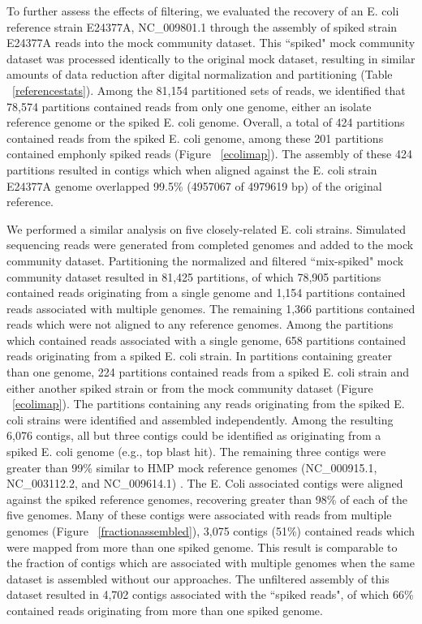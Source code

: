 \documentclass[11pt]{article} %
\begin{document}
To further assess the effects of filtering, we evaluated the recovery of an E. coli reference strain E24377A, NC\_009801.1 through the assembly of spiked strain E24377A reads into the mock community dataset.  This ``spiked" mock community dataset was processed identically to the original mock dataset, resulting in similar amounts of data reduction after digital normalization and partitioning (Table ~\ref{referencestats}).  Among the 81,154 partitioned sets of reads, we identified that 78,574 partitions contained reads from only one genome, either an isolate reference genome or the spiked E. coli genome.  Overall, a total of 424 partitions contained reads from the spiked E. coli genome, among these 201 partitions contained emph{only} spiked reads (Figure ~\ref{ecolimap}).  The assembly of these 424 partitions resulted in contigs which when aligned against the E. coli strain E24377A genome overlapped 99.5\% (4957067 of 4979619 bp) of the original reference.

We performed a similar analysis on five closely-related E. coli strains.  Simulated sequencing reads were generated from completed genomes and added to the mock community dataset.  Partitioning the normalized and filtered ``mix-spiked" mock community dataset resulted in 81,425 partitions, of which 78,905 partitions contained reads originating from a single genome and 1,154 partitions contained reads associated with multiple genomes.  The remaining 1,366 partitions contained reads which were not aligned to any reference genomes.  Among the partitions which contained reads associated with a single genome, 658 partitions contained reads originating from a spiked E. coli strain.  In partitions containing greater than one genome, 224 partitions contained reads from a spiked E. coli strain and either another spiked strain or from the mock community dataset (Figure ~\ref{ecolimap}).  The partitions containing any reads originating from the spiked E. coli strains were identified and assembled independently.  Among the resulting 6,076 contigs, all but three contigs could be identified as originating from a spiked E. coli genome (e.g., top blast hit).  The remaining three contigs were greater than 99\% similar to HMP mock reference genomes (NC\_000915.1, NC\_003112.2, and NC\_009614.1) .  The E. Coli associated contigs were aligned against the spiked reference genomes, recovering greater than 98\% of each of the five genomes.  Many of these contigs were associated with reads from multiple genomes (Figure ~\ref{fractionassembled}), 3,075 contigs (51\%) contained reads which were mapped from more than one spiked genome.  This result is comparable to the fraction of contigs which are associated with multiple genomes when the same dataset is assembled without our approaches.  The unfiltered assembly of this dataset resulted in 4,702 contigs associated with the ``spiked reads", of which 66\% contained reads originating from more than one spiked genome.
\end{document}
